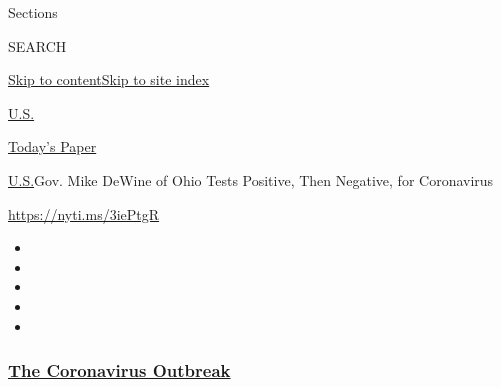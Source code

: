 Sections

SEARCH

\protect\hyperlink{site-content}{Skip to
content}\protect\hyperlink{site-index}{Skip to site index}

\href{https://www.nytimes3xbfgragh.onion/section/us}{U.S.}

\href{https://myaccount.nytimes3xbfgragh.onion/auth/login?response_type=cookie\&client_id=vi}{}

\href{https://www.nytimes3xbfgragh.onion/section/todayspaper}{Today's
Paper}

\href{/section/us}{U.S.}\textbar{}Gov. Mike DeWine of Ohio Tests
Positive, Then Negative, for Coronavirus

\url{https://nyti.ms/3iePtgR}

\begin{itemize}
\item
\item
\item
\item
\item
\end{itemize}

\hypertarget{the-coronavirus-outbreak}{%
\subsubsection{\texorpdfstring{\href{https://www.nytimes3xbfgragh.onion/news-event/coronavirus?name=styln-coronavirus-national\&region=TOP_BANNER\&variant=undefined\&block=storyline_menu_recirc\&action=click\&pgtype=Article\&impression_id=b95e04c0-e38a-11ea-bf7b-edaacc4ea387}{The
Coronavirus
Outbreak}}{The Coronavirus Outbreak}}\label{the-coronavirus-outbreak}}


